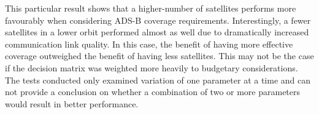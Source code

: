 This particular result shows that a higher-number of satellites performs more favourably when considering ADS-B coverage requirements. Interestingly, a fewer satellites in a lower orbit performed almost as well due to dramatically increased communication link quality. In this case, the benefit of having more effective coverage outweighed the benefit of having less satellites. This may not be the case if the decision matrix was weighted more heavily to budgetary considerations.  The tests conducted only examined variation of one parameter at a time and can not provide a conclusion on whether a combination of two or more parameters would result in better performance.

